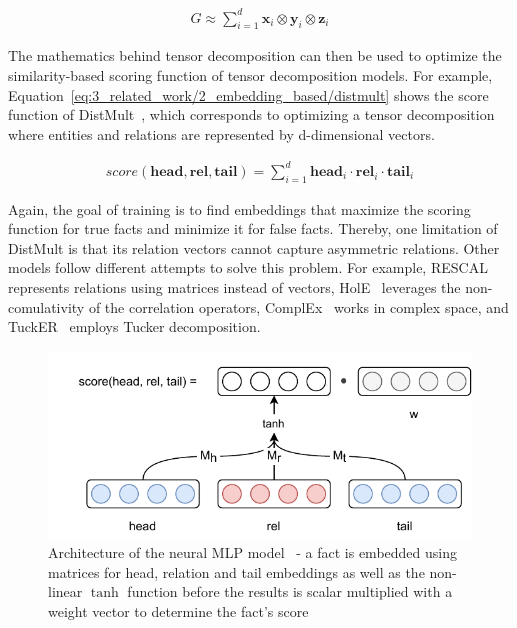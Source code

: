 \begin{align}
    G \approx \sum_{i=1}^{d} \textbf{x}_i \otimes \textbf{y}_i \otimes \textbf{z}_i
    \label{eq:3_related_work/2_embedding_based/tensor_decomposition}
\end{align}

The mathematics behind tensor decomposition can then be used to optimize the similarity-based scoring function of tensor decomposition models. For example, Equation~\ref{eq:3_related_work/2_embedding_based/distmult} shows the score function of DistMult~\cite{Yang2015EmbeddingEA}, which corresponds to optimizing a tensor decomposition where entities and relations are represented by d-dimensional vectors.

\begin{align}
    score(\textbf{head}, \textbf{rel}, \textbf{tail}) = \sum_{i=1}^{d} \textbf{head}_i \cdot \textbf{rel}_i \cdot \textbf{tail}_i
    \label{eq:3_related_work/2_embedding_based/distmult}
\end{align}

Again, the goal of training is to find embeddings that maximize the scoring function for true facts and minimize it for false facts. Thereby, one limitation of DistMult is that its relation vectors cannot capture asymmetric relations. Other models follow different attempts to solve this problem. For example, RESCAL~\cite{Nickel2013TensorFF} represents relations using matrices instead of vectors, HolE~\cite{Nickel2016HolographicEO} leverages the non-comulativity of the correlation operators, ComplEx~\cite{Trouillon2016ComplexEF} works in complex space, and TuckER~\cite{Balazevic2019TuckERTF} employs Tucker decomposition.

\begin{figure}[t]
    \centering
    \includegraphics{3_related_work/2_embedding_based/mlp}
    \caption{Architecture of the neural MLP model~\cite{Dong2014KnowledgeVA} - a fact is embedded using matrices for head, relation and tail embeddings as well as the non-linear $\tanh$ function before the results is scalar multiplied with a weight vector to determine the fact's score}
    \label{fig:3_related_work/2_embedding_based/mlp}
\end{figure}


